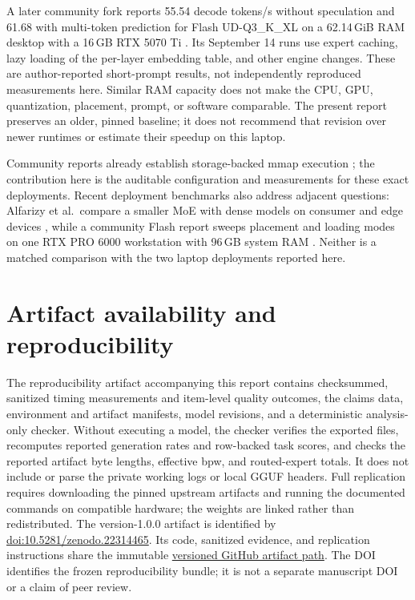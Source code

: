 \documentclass[11pt]{article}
\begin{document}
A later community fork reports 55.54 decode tokens/s without speculation and
61.68 with multi-token prediction for Flash UD-Q3\_K\_XL on a
62.14\,GiB RAM desktop with a 16\,GB RTX 5070 Ti
\citep{generelschwerz2026flashreproduction}. Its September 14 runs use expert
caching, lazy loading of the per-layer embedding table, and other engine
changes. These are author-reported short-prompt results, not independently
reproduced measurements here. Similar RAM capacity does not make the CPU,
GPU, quantization, placement, prompt, or software comparable. The present
report preserves an older, pinned baseline; it does not recommend that
revision over newer runtimes or estimate their speedup on this laptop.

Community reports already establish storage-backed mmap execution
\citep{llamacppdiscussion18758,llamacppdiscussion23324}; the contribution here
is the auditable configuration and measurements for these exact deployments.
Recent deployment benchmarks also address adjacent questions: Alfarizy et al.\
compare a smaller MoE with dense models on consumer and edge devices
\citep{alfarizy2026consumer}, while a community Flash report sweeps placement
and loading modes on one RTX PRO 6000 workstation with 96\,GB system RAM
\citep{lukallm2026flashbenchmark}. Neither is a matched comparison with the
two laptop deployments reported here.

\section{Artifact availability and reproducibility}

The reproducibility artifact accompanying this report contains
checksummed, sanitized timing measurements and item-level quality outcomes,
the claims data, environment and artifact manifests, model revisions, and a
deterministic analysis-only checker. Without
executing a model, the checker verifies the exported files, recomputes reported
generation rates and row-backed task scores, and checks the reported artifact
byte lengths, effective bpw, and routed-expert totals. It does not include or
parse the private working logs or local GGUF headers. Full replication requires
downloading the pinned upstream artifacts and running the documented commands
on compatible hardware; the weights are linked rather than redistributed.
The version-1.0.0 artifact is identified by
\href{https://doi.org/10.5281/zenodo.22314465}{doi:10.5281/zenodo.22314465}.
Its code, sanitized evidence, and replication instructions share the immutable
\href{https://github.com/matthematics1137/research-artifacts/tree/moe-nvme-streaming-v1.0.0/papers/2026-moe-nvme-streaming}{versioned GitHub artifact path}.
The DOI identifies the frozen reproducibility bundle; it is not a separate
manuscript DOI or a claim of peer review.
\end{document}
